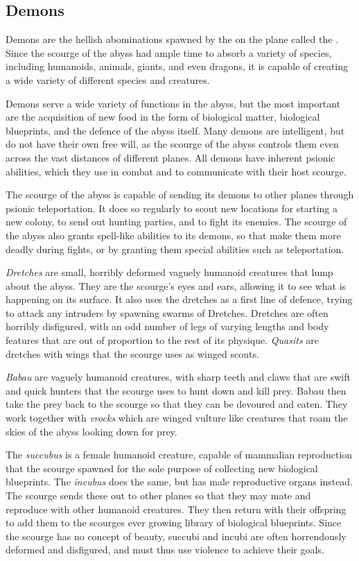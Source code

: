 \subsection{Demons}
\label{sec:Demons}

Demons are the hellish abominations spawned by the  on
the plane called the . Since the scourge of the abyss had
ample time to absorb a variety of species, including humanoids, animals, giants,
and even dragons, it is capable of creating a wide variety of different species
and creatures.

Demons serve a wide variety of functions in the abyss, but the most important
are the acquisition of new food in the form of biological matter, biological
blueprints, and the defence of the abyss itself. Many demons are intelligent,
but do not have their own free will, as the scourge of the abyss controls them
even across the vast distances of different planes. All demons have inherent
psionic abilities, which they use in combat and to communicate with their host
scourge.

The scourge of the abyss is capable of sending its demons to other planes
through psionic teleportation. It does so regularly to scout new locations for
starting a new colony, to send out hunting parties, and to fight its enemies.
The scourge of the abyss also grants spell-like abilities to its demons, so
that make them more deadly during fights, or by granting them special
abilities such as teleportation.

\emph{Dretches} are small, horribly deformed vaguely humanoid creatures that
lump about the abyss. They are the scourge's eyes and ears, allowing it to
see what is happening on its surface. It also uses the dretches as a first
line of defence, trying to attack any intruders by spawning swarms of
Dretches. Dretches are often horribly disfigured, with an odd number of legs
of varying lengths and body features that are out of proportion to the rest of
its physique. \emph{Quasits} are dretches with wings that the scourge uses as
winged scouts.

\emph{Babau} are vaguely humanoid creatures, with sharp teeth and claws that
are swift and quick hunters that the scourge uses to hunt down and kill
prey. Babau then take the prey back to the scourge so that they can be
devoured and eaten. They work together with \emph{vrocks} which are winged
vulture like creatures that roam the skies of the abyss looking down for prey.

The \emph{succubus} is a female humanoid creature, capable of mammalian
reproduction that the scourge spawned for the sole purpose of collecting new
biological blueprints. The \emph{incubus} does the same, but has male
reproductive organs instead. The scourge sends these out to other planes
so that they may mate and reproduce with other humanoid creatures. They
then return with their offspring to add them to the scourges ever growing
library of biological blueprints. Since the scourge has no concept of beauty,
succubi and incubi are often horrendously deformed and disfigured, and must
thus use violence to achieve their goals.

